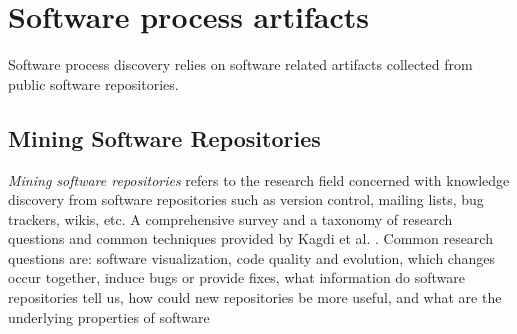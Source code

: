 \chapter{Software process artifacts}
Software process discovery relies on software related artifacts collected from public software repositories. 

\section{Mining Software Repositories}
\textit{Mining software repositories} refers to the research field concerned with knowledge discovery from 
software repositories such as version control, mailing lists, bug trackers, wikis, etc. 
A comprehensive survey and a taxonomy of research questions and common techniques provided by 
Kagdi et al. \cite{citeulike:4534888}. Common research questions are: software visualization, 
code quality and evolution, which changes occur together, induce bugs or provide fixes, what information do software repositories tell us, how could new repositories be
more useful, and what are the underlying properties of software